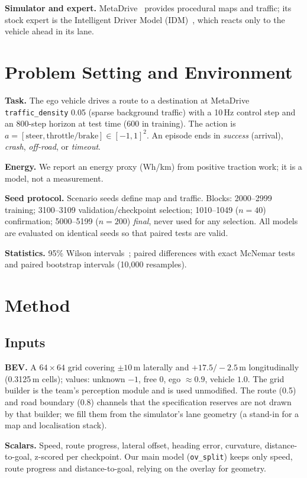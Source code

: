 \documentclass[conference]{IEEEtran}
\newcommand{\ovs}{\texttt{ov\_split}}
\begin{document}
\textbf{Simulator and expert.} MetaDrive~\cite{li2022metadrive} provides procedural maps and traffic; its stock expert is the Intelligent Driver Model (IDM)~\cite{treiber2000idm}, which reacts only to the vehicle ahead in its lane.

\section{Problem Setting and Environment}
\textbf{Task.} The ego vehicle drives a route to a destination at MetaDrive \texttt{traffic\_density} 0.05 (sparse background traffic) with a 10\,Hz control step and an 800-step horizon at test time (600 in training). The action is $a=[\text{steer},\text{throttle/brake}]\in[-1,1]^2$. An episode ends in \emph{success} (arrival), \emph{crash}, \emph{off-road}, or \emph{timeout}.

\textbf{Energy.} We report an energy proxy (Wh/km) from positive traction work; it is a model, not a measurement.

\textbf{Seed protocol.} Scenario seeds define map and traffic. Blocks: 2000--2999 training; 3100--3109 validation/checkpoint selection; 1010--1049 ($n{=}40$) confirmation; 5000--5199 ($n{=}200$) \emph{final}, never used for any selection. All models are evaluated on identical seeds so that paired tests are valid.

\textbf{Statistics.} 95\% Wilson intervals~\cite{wilson1927}; paired differences with exact McNemar tests~\cite{mcnemar1947} and paired bootstrap intervals (10{,}000 resamples).

\section{Method}\label{sec:method}
\subsection{Inputs}
\textbf{BEV.} A $64{\times}64$ grid covering $\pm10$\,m laterally and $+17.5/-2.5$\,m longitudinally (0.3125\,m cells); values: unknown $-1$, free $0$, ego $\approx0.9$, vehicle $1.0$. The grid builder is the team's perception module and is used unmodified. The route (0.5) and road boundary (0.8) channels that the specification reserves are not drawn by that builder; we fill them from the simulator's lane geometry (a stand-in for a map and localisation stack).

\textbf{Scalars.} Speed, route progress, lateral offset, heading error, curvature, distance-to-goal, z-scored per checkpoint. Our main model (\ovs) keeps only speed, route progress and distance-to-goal, relying on the overlay for geometry.
\end{document}
